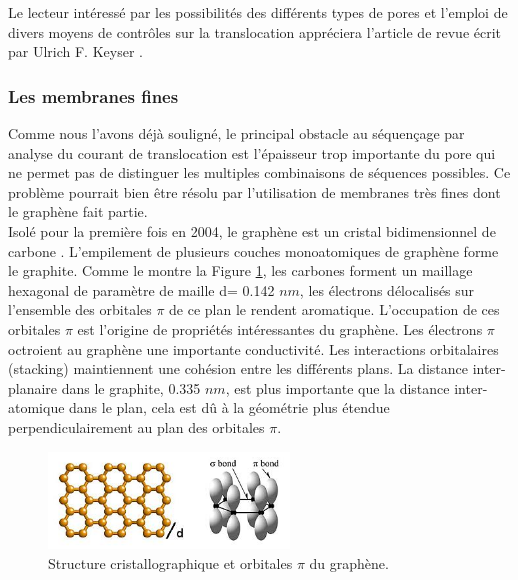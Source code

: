 \documentclass[a4paper,11pt]{article}
\begin{document}
Le lecteur intéressé par les possibilités des différents types de pores et l'emploi de divers moyens de contrôles sur la translocation appréciera l'article de revue écrit par Ulrich F. Keyser \cite{keyser}. 




\subsubsection{Les membranes fines}

Comme nous l'avons déjà souligné, le principal obstacle au séquençage par analyse du courant de translocation est l'épaisseur trop importante du pore qui ne permet pas de distinguer les multiples combinaisons de séquences possibles. Ce problème pourrait bien être résolu par l'utilisation de membranes très fines dont le graphène fait partie.\\

Isolé pour la première fois en 2004, le graphène est un cristal bidimensionnel de carbone \cite{graph}. L'empilement de plusieurs couches monoatomiques de graphène forme le graphite. Comme le montre la Figure \ref{orbit}, les carbones forment un maillage hexagonal de paramètre de maille d= 0.142 $nm$, les électrons délocalisés sur l'ensemble des orbitales $\pi$ de ce plan le rendent aromatique. L'occupation de ces orbitales $\pi$ est l'origine de propriétés intéressantes du graphène. Les électrons $\pi$ octroient au graphène une importante conductivité. Les interactions orbitalaires (stacking) maintiennent une cohésion entre les différents plans. La distance inter-planaire dans le graphite, 0.335 $nm$, est plus importante que la distance inter-atomique dans le plan, cela est dû à la géométrie plus étendue perpendiculairement au plan des orbitales $\pi$.

\begin{figure}[H]
\begin{center}
\includegraphics[width=0.57\textwidth]{orbitals2.jpg} 
\caption{Structure cristallographique et orbitales $\pi$ du graphène.}
\label{orbit}
\end{center}
\end{figure}
 
\end{document}
